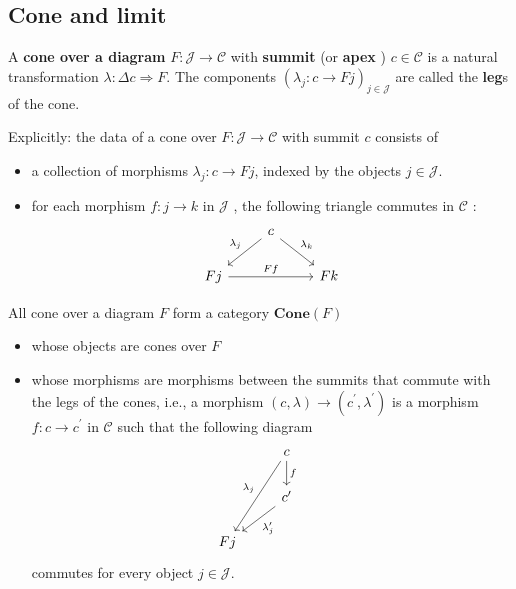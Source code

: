 \documentclass[12pt, oneside]{book}
\begin{document}
\subsection{Cone and limit} %
\begin{definition}
    A \textbf{cone over a diagram} $F:\mathcal{J} \to \mathcal{C}$ with \textbf{summit} (or \textbf{apex} ) $c\in\mathcal{C}$ is a natural transformation $\lambda:\Delta c\Rightarrow F$.
    The components $(\lambda_j:c\to Fj)_{j\in\mathcal{J}}$ are called the \textbf{leg}s of the cone.
    \begin{remark}
        Explicitly: the data of a cone over $F: \mathcal{J} \rightarrow \mathcal{C}$ with summit $c$ consists of
        \begin{itemize}
            \item
                  a collection of morphisms $\lambda_j: c \rightarrow F j$, indexed by the objects $j \in \mathcal{J}$.
            \item
                  for each morphism $f: j \rightarrow k$ in $\mathcal{J}$ , the following triangle commutes in $\mathcal{C}$ :
                  \begin{equation*}
                      \begin{tikzcd}
                          &c\arrow[ld,"\lambda_j"']\arrow[rd,"\lambda_k"]&\\
                          Fj\arrow[rr,"Ff"]&&Fk
                      \end{tikzcd}
                  \end{equation*}
        \end{itemize}
    \end{remark}
\end{definition}

\begin{definition}
    All cone over a diagram $F$ form a category $\mathbf{Cone}\left(F\right)$ \begin{itemize}
        \item
              whose objects are cones over $F$
        \item
              whose morphisms are morphisms between the summits that commute with the legs of the cones, i.e., a  morphism $\left(c,\lambda\right)\to \left(c^\prime,\lambda^\prime\right)$ is a morphism $f:c\to c^\prime$ in $\mathcal{C}$ such that the following diagram
              \begin{equation*}
                  \begin{tikzcd}
                      &c\arrow[d,"f"]\arrow[ldd,"\lambda_j"']&\\
                      & c^\prime\arrow[ld,"\lambda^\prime_j"] &\\
                      Fj &&
                  \end{tikzcd}
              \end{equation*}
              commutes for every object $j\in\mathcal{J}$.
    \end{itemize}
\end{definition}
\end{document}

